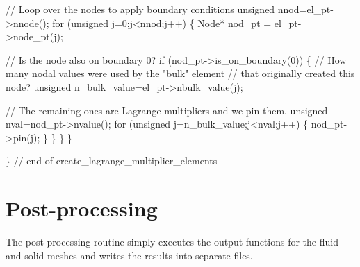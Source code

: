 \begin{DoxyCodeInclude}
   
   \textcolor{comment}{// Loop over the nodes to apply boundary conditions}
   \textcolor{keywordtype}{unsigned} nnod=el\_pt->nnode();
   \textcolor{keywordflow}{for} (\textcolor{keywordtype}{unsigned} j=0;j<nnod;j++)
    \{
     Node* nod\_pt = el\_pt->node\_pt(j);
     
     \textcolor{comment}{// Is the node also on boundary 0? }
     \textcolor{keywordflow}{if} (nod\_pt->is\_on\_boundary(0))
      \{
       \textcolor{comment}{// How many nodal values were used by the "bulk" element}
       \textcolor{comment}{// that originally created this node?}
       \textcolor{keywordtype}{unsigned} n\_bulk\_value=el\_pt->nbulk\_value(j);
       
        \textcolor{comment}{// The remaining ones are Lagrange multipliers and we pin them.}
       \textcolor{keywordtype}{unsigned} nval=nod\_pt->nvalue();
       \textcolor{keywordflow}{for} (\textcolor{keywordtype}{unsigned} j=n\_bulk\_value;j<nval;j++)
        \{
         nod\_pt->pin(j);
        \}
      \}
    \}
  \}
 
\} \textcolor{comment}{// end of create\_lagrange\_multiplier\_elements}

\end{DoxyCodeInclude}




 

\hypertarget{index_doc_solution}{}\section{Post-\/processing}\label{index_doc_solution}
The post-\/processing routine simply executes the output functions for the fluid and solid meshes and writes the results into separate files.


